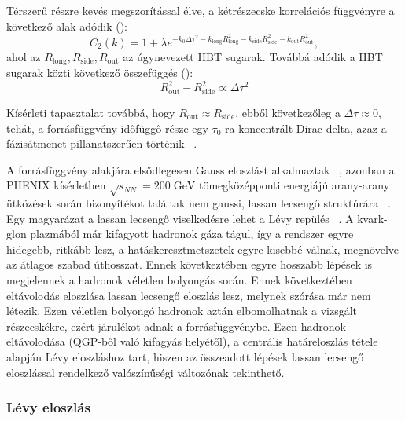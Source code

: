 \documentclass[11pt,a4paper]{article}
\numberwithin{equation}{subsection}
\numberwithin{figure}{section}
\begin{document}
Térszerű részre kevés megszorítással élve, a kétrészecske korrelációs függvényre a következő alak adódik (\cite{CsanadHabil}):
\begin{equation}
C_2(k)=1+\lambda e^{-k_0\Delta\tau^2-k_{\mathrm{long}}R_{\mathrm{long}}^2-k_{\mathrm{side}}R_{\mathrm{side}}^2-k_{\mathrm{out}}R_{\mathrm{out}}^2},
\end{equation}
ahol az $R_{\mathrm{long}},R_{\mathrm{side}},R_{\mathrm{out}}$ az úgynevezett HBT sugarak. Továbbá adódik a HBT sugarak közti következő összefüggés (\cite{CsanadHabil}):
\begin{equation}
R_{\mathrm{out}}^2-R_{\mathrm{side}}^2\propto \Delta\tau^2
\end{equation}

Kísérleti tapasztalat továbbá, hogy $R_{\mathrm{out}}\approx R_{\mathrm{side}}$, ebből következőleg a $\Delta\tau\approx 0$, tehát, a  forrásfüggvény időfüggő része egy $\tau_0$-ra koncentrált Dirac-delta, azaz a fázisátmenet pillanatszerűen történik ~\cite{Ster:2010ia, Csorgo:1999sj, Csanad:2009wc}.



A forrásfüggvény alakjára elsődlegesen Gauss eloszlást alkalmaztak ~\cite{Csorgo:2005gd, Lisa:2005dd}, azonban a PHENIX kísérletben $\sqrt{s_{NN}}=200\;\mathrm{GeV}$ tömegközépponti energiájú arany-arany ütközések során bizonyítékot találtak nem gaussi, lassan lecsengő struktúrára ~\cite{Adler:2006as}. Egy magyarázat a lassan lecsengő viselkedésre lehet a Lévy repülés ~\cite{Csanad:2007fr}. A kvark-glon plazmából már kifagyott hadronok gáza tágul, így a rendszer egyre hidegebb, ritkább lesz, a hatáskeresztmetszetek egyre kisebbé válnak, megnövelve az átlagos szabad úthosszat. Ennek következtében egyre hosszabb lépések is megjelennek a hadronok véletlen bolyongás során. Ennek következtében eltávolodás eloszlása lassan lecsengő eloszlás lesz, melynek szórása már nem létezik. Ezen véletlen bolyongó hadronok aztán elbomolhatnak a vizsgált részecskékre, ezért járulékot adnak a forrásfüggvénybe. Ezen hadronok eltávolodása (QGP-ből való kifagyás helyétől), a centrális határeloszlás tétele alapján Lévy eloszláshoz tart, hiszen az összeadott lépések lassan lecsengő eloszlással rendelkező valószínűségi változónak tekinthető.

\subsubsection{Lévy eloszlás}
\end{document}
